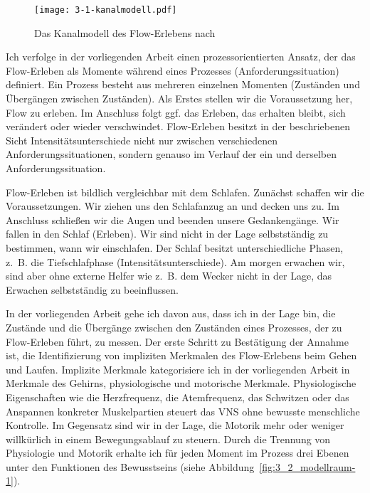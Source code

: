 \begin{figure}[t]
	\centering
		\texttt{[image: 3-1-kanalmodell.pdf]}
	\caption[Das Kanalmodell des Flow-Erlebens]{Das Kanalmodell des Flow-Erlebens nach \citet[S.~75]{Csikszentmihalyi2010}}
	\label{fig:3_1_kanalmodell}
\end{figure}

Ich verfolge in der vorliegenden Arbeit einen prozessorientierten Ansatz, der das Flow-Erleben als Momente während eines Prozesses (Anforderungssituation) definiert. Ein Prozess besteht aus mehreren einzelnen Momenten (Zuständen und Übergängen zwischen Zuständen). Als Erstes stellen wir die Voraussetzung her, Flow zu erleben. Im Anschluss folgt ggf. das Erleben, das erhalten bleibt, sich verändert oder wieder verschwindet. Flow-Erleben besitzt in der beschriebenen Sicht Intensitätsunterschiede nicht nur zwischen verschiedenen Anforderungssituationen, sondern genauso im Verlauf der ein und derselben Anforderungssituation.

Flow-Erleben ist bildlich vergleichbar mit dem Schlafen. Zunächst schaffen wir die Voraussetzungen. Wir ziehen uns den Schlafanzug an und decken uns zu. Im Anschluss schließen wir die Augen und beenden unsere Gedankengänge. Wir fallen in den Schlaf (Erleben). Wir sind nicht in der Lage selbstständig zu bestimmen, wann wir einschlafen. Der Schlaf besitzt unterschiedliche Phasen, z.~B. die Tiefschlafphase (Intensitätsunterschiede). Am morgen erwachen wir, sind aber ohne externe Helfer wie z.~B. dem Wecker nicht in der Lage, das Erwachen selbstständig zu beeinflussen.

In der vorliegenden Arbeit gehe ich davon aus, dass ich in der Lage bin, die Zustände und die Übergänge zwischen den Zuständen eines Prozesses, der zu Flow-Erleben führt, zu messen. Der erste Schritt zu Bestätigung der Annahme ist, die Identifizierung von impliziten Merkmalen des Flow-Erlebens beim Gehen und Laufen. Implizite Merkmale kategorisiere ich in der vorliegenden Arbeit in Merkmale des Gehirns, physiologische und motorische Merkmale. Physiologische Eigenschaften wie die Herzfrequenz, die Atemfrequenz, das Schwitzen oder das Anspannen konkreter Muskelpartien steuert das \ac{VNS} ohne bewusste menschliche Kontrolle. Im Gegensatz sind wir in der Lage, die Motorik mehr oder weniger willkürlich in einem Bewegungsablauf zu steuern. Durch die Trennung von Physiologie und Motorik erhalte ich für jeden Moment im Prozess drei Ebenen unter den Funktionen des Bewusstseins (siehe Abbildung~\ref{fig:3_2_modellraum-1}).

